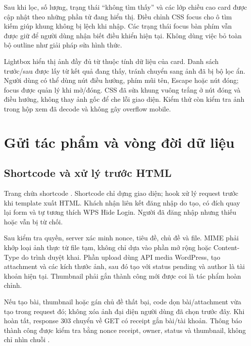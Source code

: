 Sau khi lọc, số lượng, trạng thái ``không tìm thấy'' và các lớp chiều cao card được cập nhật theo những phần tử đang hiển thị. Điều chỉnh CSS focus cho ô tìm kiếm giúp khung không bị lệch khi nhập. Các trạng thái focus bàn phím vẫn được giữ để người dùng nhận biết điều khiển hiện tại. Không dùng việc bỏ toàn bộ outline như giải pháp sửa hình thức.

Lightbox hiển thị ảnh đầy đủ từ thuộc tính dữ liệu của card. Danh sách trước/sau được lấy từ kết quả đang thấy, tránh chuyển sang ảnh đã bị bộ lọc ẩn. Người dùng có thể dùng nút điều hướng, phím mũi tên, Escape hoặc nút đóng; focus được quản lý khi mở/đóng. CSS đã sửa khung vuông trắng ở nút đóng và điều hướng, không thay ảnh gốc để che lỗi giao diện. Kiểm thử còn kiểm tra ảnh trong hộp xem đã decode và không gây overflow mobile.

\section{Gửi tác phẩm và vòng đời dữ liệu}
\subsection{Shortcode và xử lý trước HTML}
Trang  chứa shortcode . Shortcode chỉ dựng giao diện; hook  xử lý request trước khi template xuất HTML. Khách nhận liên kết đăng nhập do  tạo, có đích quay lại form và tự tương thích WPS Hide Login. Người đã đăng nhập nhưng thiếu  hoặc  vẫn bị từ chối.

Sau kiểm tra quyền, server xác minh nonce, tiêu đề, chủ đề và file. MIME phải khớp loại ảnh thực từ file tạm, không chỉ dựa vào phần mở rộng hoặc Content-Type do trình duyệt khai. Phần upload dùng API media WordPress, tạo attachment và các kích thước ảnh, sau đó tạo  với status pending và author là tài khoản hiện tại. Thumbnail phải gắn thành công mới được coi là tác phẩm hoàn chỉnh.

Nếu tạo bài, thumbnail hoặc gán chủ đề thất bại, code dọn bài/attachment vừa tạo trong request đó; không xóa ảnh đại diện người dùng đã chọn trước đây. Khi hoàn tất, response 303 chuyển về GET có receipt gắn bài/tài khoản. Thông báo thành công được kiểm tra bằng nonce receipt, owner, status và thumbnail, không chỉ nhìn chuỗi .

